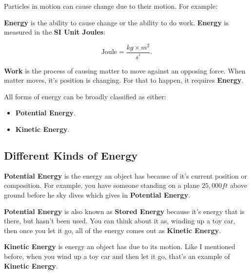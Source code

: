 
Particles in motion can cause change due to their motion. For example:

\begin{definition}[Energy]
		\textbf{Energy} is the ability to cause change or the ability to do work.
	\textbf{Energy} is measured in the \textbf{SI Unit Joules}:

	\[ \textrm{Joule} = \frac{kg \times m^2}{s^^2} .\]
\end{definition}

\begin{definition}[Work]
	\textbf{Work} is the process of causing matter to move against an opposing
	force. When matter moves, it's position is changing. For that to happen, it
	requires \textbf{Energy}.
\end{definition}

All forms of energy can be broadly classified as either:

\begin{itemize}
	\item \textbf{Potential Energy}.
	\item \textbf{Kinetic Energy}.
\end{itemize}

\subsection*{Different Kinds of Energy}

\begin{definition}
	\textbf{Potential Energy} is the energy an object has because of it's current
	position or composition. For example, you have someone standing on a plane
	$25,000 ft$ above ground before he sky dives which gives in \textbf{Potential Energy}.

	\textbf{Potential Energy} is also known as \textbf{Stored Energy} because
	it's energy that is there, but hasn't been used. You can think about it as,
	winding up a toy car, then once you let it go, all of the energy comes out as
	\textbf{Kinetic Energy}.
\end{definition}

\begin{definition}
	\textbf{Kinetic Energy} is energy an object
	has due to its motion. Like I mentioned before, when you wind up a toy car
	and then let it go, that's an example of \textbf{Kinetic Energy}.
\end{definition}

